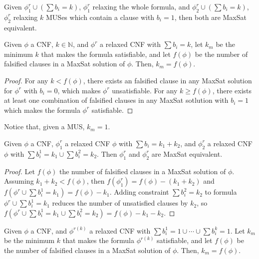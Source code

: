 \documentclass[runningheads,a4paper]{llncs}
\begin{document}
Given $\phi^r_ 1 \cup (\sum b_ i= k)$, $\phi^r_1$ relaxing the whole
formula, and $\phi^r_ 2 \cup (\sum b_ i= k)$, $\phi^r_2$ relaxing $k$
MUSes which contain a clause with $b_i=1$, then both are MaxSat equivalent.

\begin{corollary}
Given $\phi$ a CNF, $k \in \mathbb{N}$, and $\phi^r$  a relaxed CNF with $\sum b_i = k$,
let $k_m$ be the minimum $k$ that makes the formula satisfiable, and
let $f(\phi)$ be the number of falsified clauses in a MaxSat
solution of $\phi$. Then, $k_m = f(\phi)$.
\label{lem:rcnf}
\end{corollary}

\begin{proof}
For any $k<f(\phi)$, there exists an falsified
clause in any MaxSat solution for $\phi^r$ with $b_i=0$, which makes $\phi^r$ unsatisfiable.
For any $k \ge f(\phi)$, there exists at least one combination of
falsified clauses
in any MaxSat sotlution with $b_i=1$ which makes the formula $\phi^r$ satisfiable.
\end{proof}

Notice that, given a MUS, $k_m = 1$.

\begin{lemma}
Given $\phi$ a CNF, $\phi^r_1$ a relaxed CNF $\phi$  with $\sum b_i =
k_1 + k_2$, and $\phi^r_2$ a relaxed CNF $\phi$  with $\sum b_i^1 =
k_1 \cup \sum b_i^2 = k_2$.
Then $\phi^r_1$ and $\phi^r_2$ are MaxSat equivalent.
\end{lemma}

\begin{proof}
Let $f(\phi)$ the number of falsified clauses in a MaxSat solution of
$\phi$.
Assuming $k_1 + k_2 < f(\phi)$, then $f(\phi^r_1) = f(\phi) -(k_1+k_2)$
and $f(\phi^r \cup \sum b_i^1 = k_1)= f(\phi) - k_1$.  
Adding constraint $\sum b_i^2 = k_2$ to formula  $\phi^r \cup \sum b_i^1 = k_1$
reduces the number of unsatisfied clauses by $k_2$, so 
$f(\phi^r \cup \sum b_i^1 = k_1 \cup \sum b_i^2 = k_2 ) = f(\phi) -  k_1 -
k_2$.
\end{proof}

\begin{corollary}
Given $\phi$ a CNF, and $\phi^{r(k)}$ a relaxed CNF with $\sum b_i^1 =
1 \cup \cdots \cup \sum b_i^k = 1$. Let $k_m$ be the minimum $k$ that makes the formula
$\phi^{r(k)}$ satisfiable, and let $f(\phi)$ be the number of falsified clauses in a
MaxSat solution of $\phi$. Then, $k_m = f(\phi)$.
\label{lem:rcnf2}
\end{corollary}
\end{document}
